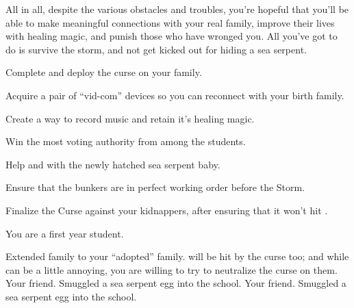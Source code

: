 \documentclass[char]{GL2020}
\begin{document}
All in all, despite the various obstacles and troubles, you’re hopeful that you’ll be able to make meaningful connections with your real family, improve their lives with healing magic, and punish those who have wronged you.  All you’ve got to do is survive the storm, and not get kicked out for hiding a sea serpent.

\begin{itemz}[Goals]
	\item Complete and deploy the curse on your family. 
	\item Acquire a pair of ``vid-com'' devices so you can reconnect with your birth family.
	\item Create a way to record music and retain it's healing magic.
	\item Win the most voting authority from among the \pFarmers{} students.
	\item Help \cPirateChild{} and \cDisney{} with the newly hatched sea serpent baby.
	\item Ensure that the bunkers are in perfect working order before the Storm.
	\item Finalize the Curse against your kidnappers, after ensuring that it won't hit \cMusic{}.
\end{itemz}

\begin{itemz}[Notes]
	\item You are a first year student.
\end{itemz}

\begin{contacts}
	\contact{\cMusic{}} Extended family to your ``adopted'' family. \cMusic{\They} will be hit  by the curse too; and while \cMusic{} can be a little annoying, you are willing to try to neutralize the curse on them.
	\contact{\cPirateChild{}} Your friend. Smuggled a sea serpent egg into the school.
	\contact{\cDisney{}} Your friend. Smuggled a sea serpent egg into the school.
\end{contacts}
\end{document}
